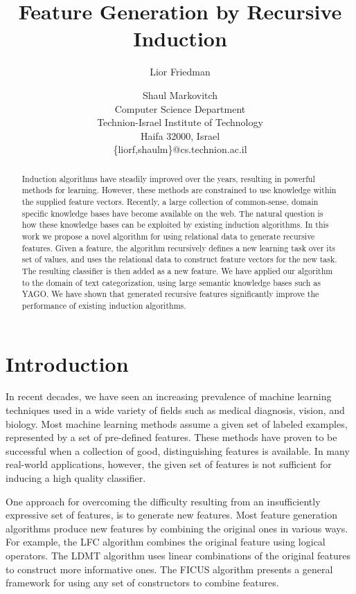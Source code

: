 \documentclass{article}
\title{Feature Generation by Recursive Induction}
\author{Lior Friedman \and Shaul Markovitch\\
	Computer Science Department \\
	Technion-Israel Institute of Technology\\
	Haifa 32000, Israel\\
	\{liorf,shaulm\}@cs.technion.ac.il}
\theoremstyle{definition}
\begin{document}
\maketitle

\begin{abstract}
  Induction algorithms have steadily improved over the years, resulting in powerful methods for learning. However, these methods are constrained to use knowledge within the supplied feature vectors. Recently, a large collection of common-sense, domain specific knowledge bases have become available on the web. The natural question is how these knowledge bases can be exploited by existing induction algorithms.
  In this work we propose a novel algorithm for using relational data to generate recursive features. Given a feature, the algorithm recursively defines a new learning task over its set of values, and uses the relational data to construct feature vectors for the new task. The resulting classifier is then added as a new feature.
  We have applied our algorithm to the domain of text categorization, using large semantic knowledge bases such as YAGO. We have shown that generated recursive features significantly improve the performance of existing induction algorithms.
\end{abstract}

\section{Introduction}
\label{sec:Intro}
In recent decades, we have seen an increasing prevalence of machine learning techniques used in a wide variety of fields such as medical diagnosis, vision, and biology.
Most machine learning methods assume a given set of labeled examples, represented by a set of
pre-defined features. These methods have proven to be successful when a collection of good,
distinguishing features is available.
In many real-world applications, however, the given set of features is not sufficient for inducing a high quality classifier.

One approach for overcoming the difficulty resulting from an insufficiently expressive set of features, is to generate new features.  Most feature generation algorithms produce new features by combining the original ones in various ways.  For example, the LFC algorithm \citep{ragavan1993complex} combines the original feature using logical operators.  The LDMT algorithm \citep{utgo1991linear} uses linear combinations of the original features to construct more informative ones.  The FICUS algorithm \citep{markovitch2002feature} presents a general framework for using any set of constructors to combine features.
\end{document}
